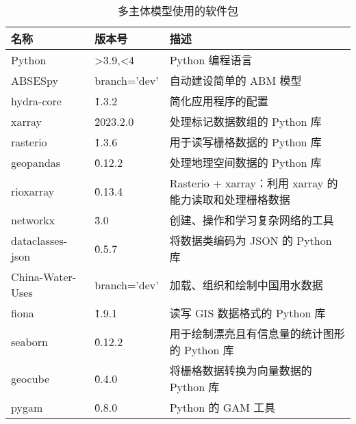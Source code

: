 \begin{table}[htbp]
    \centering
    \caption{多主体模型使用的软件包}
      \begin{tabularx}{\textwidth}{p{1.5cm} p{1.5cm} L}
        \toprule
      名称    & 版本号   & 描述 \\
      \midrule
      Python & >3.9,<4 & Python 编程语言 \\
      ABSESpy & branch='dev' & 自动建设简单的 ABM 模型 \\
      hydra-core & \^1.3.2 & 简化应用程序的配置 \\
      xarray & \^2023.2.0 & 处理标记数据数组的 Python 库 \\
      rasterio & \^1.3.6 & 用于读写栅格数据的 Python 库 \\
      geopandas & \^0.12.2 & 处理地理空间数据的 Python 库 \\
      rioxarray & \^0.13.4 & Rasterio + xarray：利用 xarray 的能力读取和处理栅格数据 \\
      networkx & \^3.0 & 创建、操作和学习复杂网络的工具 \\
      dataclasses-json & \^0.5.7 & 将数据类编码为 JSON 的 Python 库 \\
      China-Water-Uses & branch='dev' & 加载、组织和绘制中国用水数据 \\
      fiona & \^1.9.1 & 读写 GIS 数据格式的 Python 库 \\
      seaborn & \^0.12.2 & 用于绘制漂亮且有信息量的统计图形的 Python 库 \\
      geocube & \^0.4.0 & 将栅格数据转换为向量数据的 Python 库 \\
      pygam & \^0.8.0 & Python 的 GAM 工具 \\
      \bottomrule
      \end{tabularx}%
    \label{ch6:tab:packages}%
  \end{table}%
  